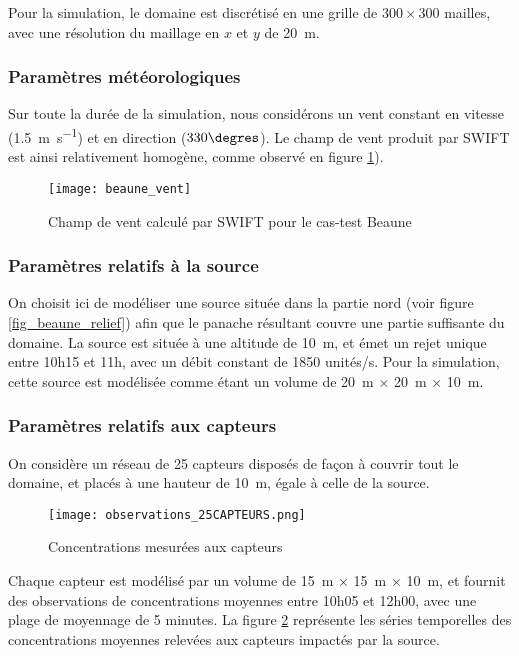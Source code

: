 Pour la simulation, le domaine est discrétisé en une grille de $300 \times 300$ mailles, avec une résolution du maillage en $x$ et $y$ de \SI{20}{\meter}.

\subsubsection{Paramètres météorologiques}
Sur toute la durée de la simulation, nous considérons un vent constant en vitesse (\SI{1.5}{\m\per\second}) et en direction ($330\degres$). Le champ de vent produit par SWIFT est ainsi relativement homogène, comme observé en figure \ref{fig_beaune_vent}).

\begin{figure}[h!]
	\centering
	\texttt{[image: beaune\_vent]}
	\caption{Champ de vent calculé par SWIFT pour le cas-test Beaune}
	\label{fig_beaune_vent}
\end{figure}


\subsubsection{Paramètres relatifs à la source}
On choisit ici de modéliser une source située dans la partie nord (voir figure \ref{fig_beaune_relief}) afin que le panache résultant couvre une partie suffisante du domaine. La source est située à une altitude de \SI{10}{\m}, et émet un rejet unique entre 10h15 et 11h, avec un débit constant de 1850 unités/s. Pour la simulation, cette source est modélisée comme étant un volume de \SI{20}{\m} $\times$ \SI{20}{\m} $\times$ \SI{10}{\m}. 

\subsubsection{Paramètres relatifs aux capteurs}
On considère un réseau de 25 capteurs disposés de façon à couvrir tout le domaine, et placés à une hauteur de \SI{10}{\meter}, égale à celle de la source. 

\begin{figure}[h!]
	\centering
	\texttt{[image: observations\_25CAPTEURS.png]}
	\caption{Concentrations mesurées aux capteurs}
	\label{fig_observations_25CAPTEURS}
\end{figure}

Chaque capteur est modélisé par un volume de \SI{15}{\meter} $\times$ \SI{15}{\meter} $\times$ \SI{10}{\meter}, et fournit des observations de concentrations moyennes entre 10h05 et 12h00, avec une plage de moyennage de 5 minutes. La figure \ref{fig_observations_25CAPTEURS} représente les séries temporelles des concentrations moyennes relevées aux capteurs impactés par la source. 

